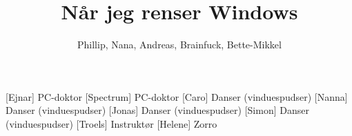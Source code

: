 \documentclass[a4paper,11pt]{article}
\title{Når jeg renser Windows}
\author{Phillip, Nana, Andreas, Brainfuck, Bette-Mikkel}
\begin{document}
\maketitle

\begin{roles}
[Ejnar] PC-doktor
[Spectrum] PC-doktor
[Caro] Danser (vinduespudser)
[Nanna] Danser (vinduespudser)
[Jonas] Danser (vinduespudser)
[Simon] Danser (vinduespudser)
[Troels] Instruktør
[Helene] Zorro
\end{roles}

\begin{props}






\end{props}
\end{document}
